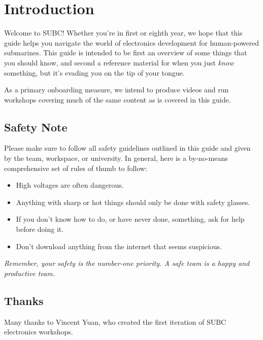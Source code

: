 \chapter{Introduction}
Welcome to SUBC! Whether you're in first or eighth year, we hope that this guide helps you navigate the world of electronics development for human-powered submarines. This guide is intended to be first an overview of some things that you should know, and second a reference material for when you just \emph{know} something, but it's evading you on the tip of your tongue.

As a primary onboarding measure, we intend to produce videos and run workshops covering much of the same content as is covered in this guide.

\section{Safety Note}
Please make sure to follow all safety guidelines outlined in this guide and given by the team, workspace, or university. In general, here is a by-no-means comprehensive set of rules of thumb to follow:
\begin{itemize}
	\item High voltages are often dangerous.
	\item Anything with sharp or hot things should only be done with safety glasses.
	\item If you don't know how to do, or have never done, something, ask for help before doing it.
	\item Don't download anything from the internet that seems suspicious.
\end{itemize}
\emph{Remember, your safety is the number-one priority. A safe team is a happy and productive team.}

\section{Thanks}
Many thanks to Vincent Yuan, who created the first iteration of SUBC electronics workshops.